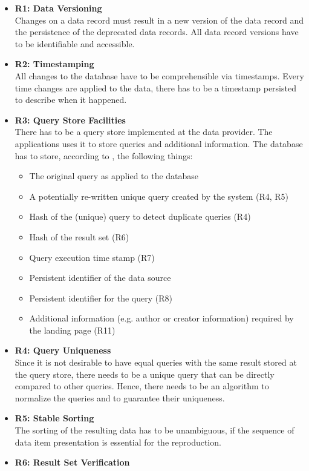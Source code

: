 \documentclass[draft,final]{vutinfth} %
\begin{document}
\begin{itemize}
	\item \textbf{R1: Data Versioning} \\
	Changes on a data record must result in a new version of the data record and the persistence of the deprecated data records. All data record versions have to be identifiable and accessible. 
	\item \textbf{R2: Timestamping} \\
	All changes to the database have to be comprehensible via timestamps. Every time changes are applied to the data, there has to be a timestamp persisted to describe when it happened. 
	\item \textbf{R3: Query Store Facilities} \\
	There has to be a query store implemented at the data provider. The applications uses it to store queries and additional information. The database has to store, according to \cite{rauber2016identification}, the following things: 
	\begin{itemize}
		\item The original query as applied to the database
		\item A potentially re-written unique query created by the system (R4, R5)
		\item Hash of the (unique) query to detect duplicate queries (R4)
		\item Hash of the result set (R6)
		\item Query execution time stamp (R7)
		\item Persistent identifier of the data source
		\item Persistent identifier for the query (R8)
		\item Additional information (e.g. author or creator information) required by the landing page (R11)
	\end{itemize}
	\item \textbf{R4: Query Uniqueness} \\
	Since it is not desirable to have equal queries with the same result stored at the query store, there needs to be a unique query that can be directly compared to other queries. Hence, there needs to be an algorithm to normalize the queries and to guarantee their uniqueness.
	\item \textbf{R5: Stable Sorting} \\
	The sorting of the resulting data has to be unambiguous, if the sequence of data item presentation is essential for the reproduction.
	\item \textbf{R6: Result Set Verification} \\

\end{itemize}
\end{document}
